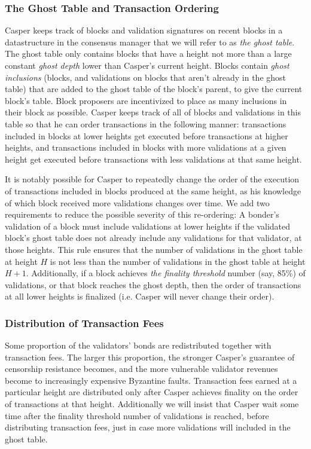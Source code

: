 \documentclass[11pt,a4paper]{article}
\begin{document}
\subsubsection{The Ghost Table and Transaction Ordering}

Casper keeps track of blocks and validation signatures on recent blocks in a datastructure in the consensus manager that we will refer to as \emph{the ghost table}. The ghost table only contains blocks that have a height not more than a large constant \emph{ghost depth} lower than Casper's current height. Blocks contain \emph{ghost inclusions} (blocks, and validations on blocks that aren't already in the ghost table) that are added to the ghost table of the block's parent, to give the current block's table. Block proposers are incentivized to place as many inclusions in their block as possible. Casper keeps track of all of blocks and validations in this table so that he can order transactions in the following manner: transactions included in blocks at lower heights get executed before transactions at higher heights, and transactions included in blocks with more validations at a given height get executed before transactions with less validations at that same height.

It is notably possible for Casper to repeatedly change the order of the execution of transactions included in blocks produced at the same height, as his knowledge of which block received more validations changes over time. We add two requirements to reduce the possible severity of this re-ordering: A bonder's validation of a block must include validations at lower heights if the validated block's ghost table does not already include any validations for that validator, at those heights. This rule ensures that the number of validations in the ghost table at height $H$ is not less than the number of validations in the ghost table at height $H + 1$. Additionally, if a block achieves \emph{the finality threshold} number (say, 85\%) of validations, or that block reaches the ghost depth, then the order of transactions at all lower heights is finalized (i.e. Casper will never change their order).


\subsubsection{Distribution of Transaction Fees}

Some proportion of the validators' bonds are redistributed together with transaction fees. The larger this proportion, the stronger Casper's guarantee of censorship resistance becomes, and the more vulnerable validator revenues become to increasingly expensive Byzantine faults. Transaction fees earned at a particular height are distributed only after Casper achieves finality on the order of transactions at that height. Additionally we will insist that Casper wait some time after the finality threshold number of validations is reached, before distributing transaction fees, just in case more validations will included in the ghost table.
\end{document}

